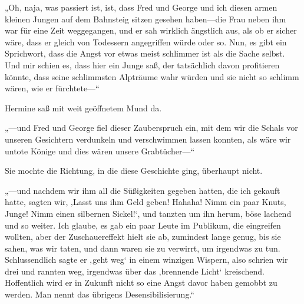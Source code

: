 „Oh, naja, was passiert ist, ist, dass Fred und George und ich diesen armen kleinen Jungen auf dem Bahnsteig sitzen gesehen haben—die Frau neben ihm war für eine Zeit weggegangen, und er sah wirklich ängstlich aus, als ob er sicher wäre, dass er gleich von Todessern angegriffen würde oder so. Nun, es gibt ein Sprichwort, dass die Angst vor etwas meist schlimmer ist als die Sache selbst. Und mir schien es, dass hier ein Junge saß, der tatsächlich davon profitieren könnte, dass seine schlimmsten Alpträume wahr würden und sie nicht so schlimm wären, wie er fürchtete—“

Hermine saß mit weit geöffnetem Mund da.

„—und Fred und George fiel dieser Zauberspruch ein, mit dem wir die Schals vor unseren Gesichtern verdunkeln und verschwimmen lassen konnten, als wäre wir untote Könige und dies wären unsere Grabtücher—“

Sie mochte die Richtung, in die diese Geschichte ging, überhaupt nicht.

„—und nachdem wir ihm all die Süßigkeiten gegeben hatten, die ich gekauft hatte, sagten wir, ‚Lasst uns ihm Geld geben! Hahaha! Nimm ein paar Knuts, Junge! Nimm einen silbernen Sickel!‘, und tanzten um ihn herum, böse lachend und so weiter. Ich glaube, es gab ein paar Leute im Publikum, die eingreifen wollten, aber der Zuschauereffekt hielt sie ab, zumindest lange genug, bis sie sahen, was wir taten, und dann waren sie zu verwirrt, um irgendwas zu tun. Schlussendlich sagte er ‚geht weg‘ in einem winzigen Wispern, also schrien wir drei und rannten weg, irgendwas über das ‚brennende Licht‘ kreischend. Hoffentlich wird er in Zukunft nicht so eine Angst davor haben gemobbt zu werden. Man nennt das übrigens Desensibilisierung.“

